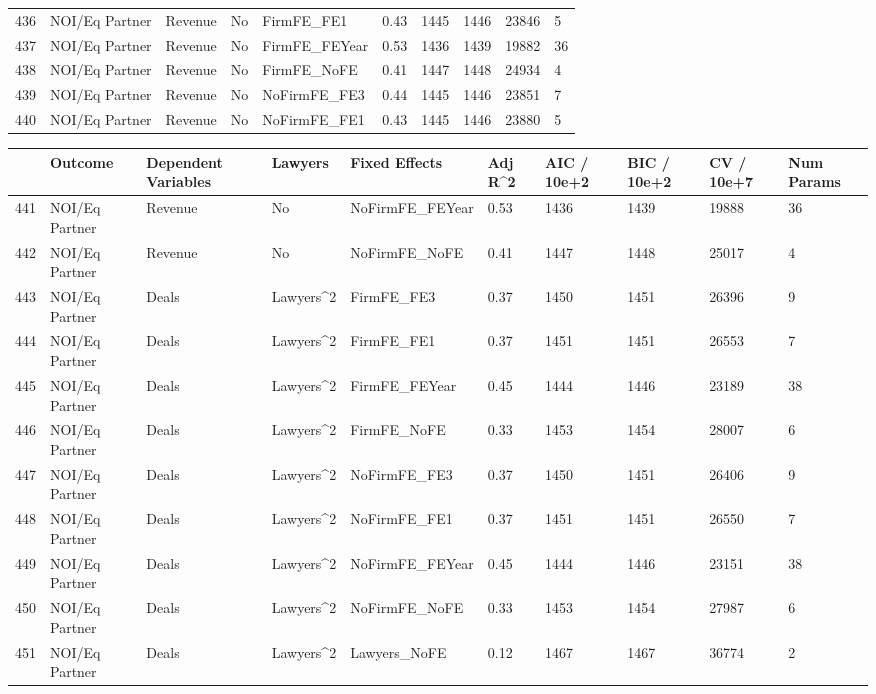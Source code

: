\documentclass{article}
\begin{document}
\begin{table}[H]
\begin{tabular}{rlllllllll}
  436 & NOI/Eq Partner & Revenue & No & FirmFE\_FE1 & 0.43 & 1445 & 1446 & 23846 & 5 \\ 
  437 & NOI/Eq Partner & Revenue & No & FirmFE\_FEYear & 0.53 & 1436 & 1439 & 19882 & 36 \\ 
  438 & NOI/Eq Partner & Revenue & No & FirmFE\_NoFE & 0.41 & 1447 & 1448 & 24934 & 4 \\ 
  439 & NOI/Eq Partner & Revenue & No & NoFirmFE\_FE3 & 0.44 & 1445 & 1446 & 23851 & 7 \\ 
  440 & NOI/Eq Partner & Revenue & No & NoFirmFE\_FE1 & 0.43 & 1445 & 1446 & 23880 & 5 \\ 
   \hline
\end{tabular}
\end{table}
\begin{table}[H]
\centering
\begin{tabular}{rlllllllll}
  \hline
 & Outcome & Dependent Variables & Lawyers & Fixed Effects & Adj R^2 & AIC / 10e+2 & BIC / 10e+2 & CV / 10e+7 & Num Params \\ 
  \hline
441 & NOI/Eq Partner & Revenue & No & NoFirmFE\_FEYear & 0.53 & 1436 & 1439 & 19888 & 36 \\ 
  442 & NOI/Eq Partner & Revenue & No & NoFirmFE\_NoFE & 0.41 & 1447 & 1448 & 25017 & 4 \\ 
  443 & NOI/Eq Partner & Deals & Lawyers^2 & FirmFE\_FE3 & 0.37 & 1450 & 1451 & 26396 & 9 \\ 
  444 & NOI/Eq Partner & Deals & Lawyers^2 & FirmFE\_FE1 & 0.37 & 1451 & 1451 & 26553 & 7 \\ 
  445 & NOI/Eq Partner & Deals & Lawyers^2 & FirmFE\_FEYear & 0.45 & 1444 & 1446 & 23189 & 38 \\ 
  446 & NOI/Eq Partner & Deals & Lawyers^2 & FirmFE\_NoFE & 0.33 & 1453 & 1454 & 28007 & 6 \\ 
  447 & NOI/Eq Partner & Deals & Lawyers^2 & NoFirmFE\_FE3 & 0.37 & 1450 & 1451 & 26406 & 9 \\ 
  448 & NOI/Eq Partner & Deals & Lawyers^2 & NoFirmFE\_FE1 & 0.37 & 1451 & 1451 & 26550 & 7 \\ 
  449 & NOI/Eq Partner & Deals & Lawyers^2 & NoFirmFE\_FEYear & 0.45 & 1444 & 1446 & 23151 & 38 \\ 
  450 & NOI/Eq Partner & Deals & Lawyers^2 & NoFirmFE\_NoFE & 0.33 & 1453 & 1454 & 27987 & 6 \\ 
  451 & NOI/Eq Partner & Deals & Lawyers^2 & Lawyers\_NoFE & 0.12 & 1467 & 1467 & 36774 & 2 \\ 

\end{tabular}
\end{table}
\end{document}
